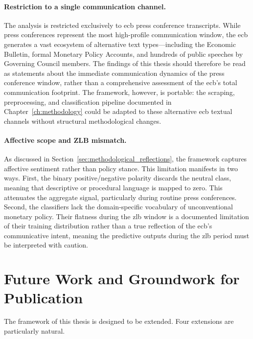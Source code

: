\paragraph{Restriction to a single communication channel.} The analysis is restricted exclusively to \gls{ecb} press conference transcripts. While press conferences represent the most high-profile communication window, the \gls{ecb} generates a vast ecosystem of alternative text types—including the Economic Bulletin, formal Monetary Policy Accounts, and hundreds of public speeches by Governing Council members. The findings of this thesis should therefore be read as statements about the immediate communication dynamics of the press conference window, rather than a comprehensive assessment of the \gls{ecb}'s total communication footprint. The framework, however, is portable: the scraping, preprocessing, and classification pipeline documented in Chapter~\ref{ch:methodology} could be adapted to these alternative \gls{ecb} textual channels without structural methodological changes.

\paragraph{Affective scope and ZLB mismatch.}
As discussed in Section~\ref{sec:methodological_reflections}, the framework captures affective sentiment rather than policy stance. This limitation manifests in two ways. First, the binary positive/negative polarity discards the neutral class, meaning that descriptive or procedural language is mapped to zero. This attenuates the aggregate signal, particularly during routine press conferences. Second, the classifiers lack the domain-specific vocabulary of unconventional monetary policy. Their flatness during the \gls{zlb} window is a documented limitation of their training distribution rather than a true reflection of the \gls{ecb}'s communicative intent, meaning the predictive outputs during the \gls{zlb} period must be interpreted with caution.

\section{Future Work and Groundwork for Publication}
\label{sec:future_work}

The framework of this thesis is designed to be extended. Four extensions are particularly natural.

